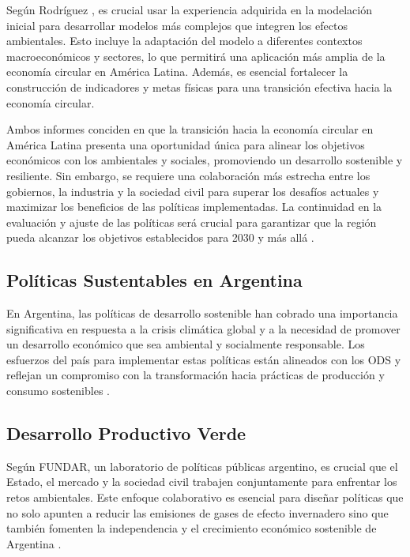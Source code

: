 \documentclass[main.tex]{subfiles}
\begin{document}
Según Rodríguez \cite{rodriguez2023modelamiento}, es crucial usar la experiencia adquirida en la modelación inicial para desarrollar modelos más complejos que integren los efectos ambientales. Esto incluye la adaptación del modelo a diferentes contextos macroeconómicos y sectores, lo que permitirá una aplicación más amplia de la economía circular en América Latina. Además, es esencial fortalecer la construcción de indicadores y metas físicas para una transición efectiva hacia la economía circular.

Ambos informes conciden en que la transición hacia la economía circular en América Latina presenta una oportunidad única para alinear los objetivos económicos con los ambientales y sociales, promoviendo un desarrollo sostenible y resiliente. Sin embargo, se requiere una colaboración más estrecha entre los gobiernos, la industria y la sociedad civil para superar los desafíos actuales y maximizar los beneficios de las políticas implementadas. La continuidad en la evaluación y ajuste de las políticas será crucial para garantizar que la región pueda alcanzar los objetivos establecidos para 2030 y más allá \cite{cepal2021economia}.

\subsection{Políticas Sustentables en Argentina}
En Argentina, las políticas de desarrollo sostenible han cobrado una importancia significativa en respuesta a la crisis climática global y a la necesidad de promover un desarrollo económico que sea ambiental y socialmente responsable. Los esfuerzos del país para implementar estas políticas están alineados con los ODS y reflejan un compromiso con la transformación hacia prácticas de producción y consumo sostenibles \cite{dormido2021fundar, sostenible2021argentina}.

\subsection{Desarrollo Productivo Verde}

Según FUNDAR, un laboratorio de políticas públicas argentino, es crucial que el Estado, el mercado y la sociedad civil trabajen conjuntamente para enfrentar los retos ambientales. Este enfoque colaborativo es esencial para diseñar políticas que no solo apunten a reducir las emisiones de gases de efecto invernadero sino que también fomenten la independencia y el crecimiento económico sostenible de Argentina \cite{dormido2021fundar}.
\end{document}
